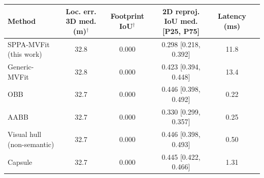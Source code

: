 \begin{tabular}{@{}lccccc@{}}
\toprule
Method & Loc. err. 3D med. (m)$^{\dagger}$ & Footprint IoU$^{\dagger}$ & 2D reproj. IoU med. [P25, P75] & Latency (ms) \\
\midrule
SPPA-MVFit (this work) & 32.8 & 0.000 & 0.298 [0.218, 0.392] & 11.8 \\
Generic-MVFit & 32.8 & 0.000 & 0.423 [0.394, 0.448] & 13.4 \\
OBB & 32.7 & 0.000 & 0.446 [0.398, 0.492] & 0.22 \\
AABB & 32.7 & 0.000 & 0.330 [0.299, 0.357] & 0.25 \\
Visual hull (non-semantic) & 32.7 & 0.000 & 0.446 [0.398, 0.493] & 0.50 \\
Capsule & 32.7 & 0.000 & 0.445 [0.422, 0.466] & 1.31 \\
\bottomrule
\end{tabular}
